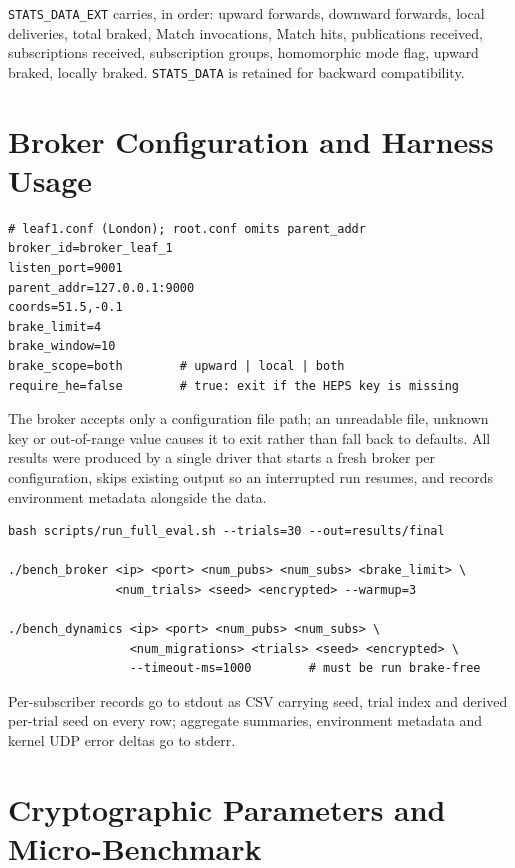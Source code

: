 \documentclass[10pt]{article}
\begin{document}
\texttt{STATS\_DATA\_EXT} carries, in order: upward forwards, downward forwards, local deliveries, total braked, Match invocations, Match hits, publications received, subscriptions received, subscription groups, homomorphic mode flag, upward braked, locally braked. \texttt{STATS\_DATA} is retained for backward compatibility.

\section{Broker Configuration and Harness Usage}
\label{app:config}

\begin{verbatim}
# leaf1.conf (London); root.conf omits parent_addr
broker_id=broker_leaf_1
listen_port=9001
parent_addr=127.0.0.1:9000
coords=51.5,-0.1
brake_limit=4
brake_window=10
brake_scope=both        # upward | local | both
require_he=false        # true: exit if the HEPS key is missing
\end{verbatim}

The broker accepts only a configuration file path; an unreadable file, unknown key or out-of-range value causes it to exit rather than fall back to defaults. All results were produced by a single driver that starts a fresh broker per configuration, skips existing output so an interrupted run resumes, and records environment metadata alongside the data.

\begin{verbatim}
bash scripts/run_full_eval.sh --trials=30 --out=results/final

./bench_broker <ip> <port> <num_pubs> <num_subs> <brake_limit> \
               <num_trials> <seed> <encrypted> --warmup=3

./bench_dynamics <ip> <port> <num_pubs> <num_subs> \
                 <num_migrations> <trials> <seed> <encrypted> \
                 --timeout-ms=1000        # must be run brake-free
\end{verbatim}

Per-subscriber records go to stdout as CSV carrying seed, trial index and derived per-trial seed on every row; aggregate summaries, environment metadata and kernel UDP error deltas go to stderr.

\section{Cryptographic Parameters and Micro-Benchmark}
\label{app:microbench}
\end{document}
